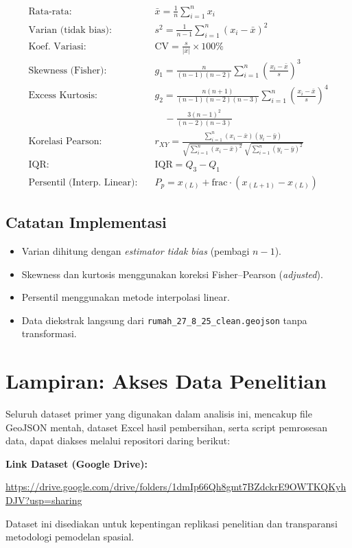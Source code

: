 \documentclass[12pt,a4paper]{article}
\begin{document}
\begin{align*}
\text{Rata-rata:} \quad & \bar{x} = \frac{1}{n} \sum_{i=1}^{n} x_i \\[6pt]
\text{Varian (tidak bias):} \quad & s^2 = \frac{1}{n-1} \sum_{i=1}^{n} (x_i - \bar{x})^2 \\[6pt]
\text{Koef. Variasi:} \quad & \text{CV} = \frac{s}{|\bar{x}|} \times 100\% \\[6pt]
\text{Skewness (Fisher):} \quad & g_1 = \frac{n}{(n-1)(n-2)} \sum_{i=1}^{n} \left(\frac{x_i - \bar{x}}{s}\right)^3 \\[6pt]
\text{Excess Kurtosis:} \quad & g_2 = \frac{n(n+1)}{(n-1)(n-2)(n-3)} \sum_{i=1}^{n}\left(\frac{x_i-\bar{x}}{s}\right)^4 \\
& \quad - \frac{3(n-1)^2}{(n-2)(n-3)} \\[6pt]
\text{Korelasi Pearson:} \quad & r_{XY} = \frac{\sum_{i=1}^{n}(x_i-\bar{x})(y_i-\bar{y})}
  {\sqrt{\sum_{i=1}^{n}(x_i-\bar{x})^2}\;\sqrt{\sum_{i=1}^{n}(y_i-\bar{y})^2}} \\[6pt]
\text{IQR:} \quad & \text{IQR} = Q_3 - Q_1 \\[6pt]
\text{Persentil (Interp.\ Linear):} \quad & P_p = x_{(L)} + \text{frac}\cdot(x_{(L+1)}-x_{(L)})
\end{align*}

\subsection{Catatan Implementasi}
\begin{itemize}
  \item Varian dihitung dengan \textit{estimator tidak bias} (pembagi $n-1$).
  \item Skewness dan kurtosis menggunakan koreksi Fisher--Pearson (\textit{adjusted}).
  \item Persentil menggunakan metode interpolasi linear.
  \item Data diekstrak langsung dari \texttt{rumah\_27\_8\_25\_clean.geojson} tanpa transformasi.
\end{itemize}

\newpage
\section{Lampiran: Akses Data Penelitian}

Seluruh dataset primer yang digunakan dalam analisis ini, mencakup file GeoJSON mentah,
dataset Excel hasil pembersihan, serta script pemrosesan data, dapat diakses
melalui repositori daring berikut:

\begin{center}
\textbf{Link Dataset (Google Drive):}\\
{\raggedright \url{https://drive.google.com/drive/folders/1dmIp66Qh8gmt7BZdckrE9OWTKQKyhDJV?usp=sharing} \par}
\end{center}

Dataset ini disediakan untuk kepentingan replikasi penelitian dan transparansi
metodologi pemodelan spasial.
\end{document}
